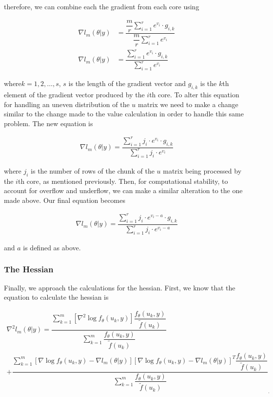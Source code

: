 \documentclass{article}
\begin{document}
\noindent therefore, we can combine each the gradient from each core using

\begin{align}
\nabla l_m(\theta|y) &=\dfrac{\dfrac{m}{r} \sum\limits_{i=1}^r e^{v_i} \cdot g_{i,k}}{\dfrac{m}{r} \sum\limits_{i=1}^r e^{v_i}} \\
\nabla l_m(\theta|y) &=\dfrac{ \sum\limits_{i=1}^r e^{v_i} \cdot g_{i,k}}{\sum\limits_{i=1}^r e^{v_i}}
\end{align}

\noindent where$k = 1, 2, \ldots, s$,  $s$ is the length of the gradient vector and $g_{i,k}$ is the $k$th element of the gradient vector produced by the $i$th core. To alter this equation for handling an uneven distribution of the $u$ matrix we need to make a change similar to the change made to the value calculation in order to handle this same problem. The new equation is

\begin{align}
\nabla l_m(\theta|y) =\dfrac{ \sum\limits_{i=1}^r j_i \cdot e^{v_i} \cdot g_{i,k}}{\sum\limits_{i=1}^r j_i \cdot e^{v_i}}
\end{align}

\noindent where $j_i$ is the number of rows of the chunk of the $u$ matrix being processed by the $i$th core, as mentioned previously. Then, for computational stability, to account for overflow and underflow, we can make a similar alteration to the one made above. Our final equation becomes

\begin{align}
\nabla l_m(\theta|y) =\dfrac{ \sum\limits_{i=1}^r j_i \cdot e^{v_i - a} \cdot g_{i,k}}{\sum\limits_{i=1}^r j_i \cdot e^{v_i - a}}
\end{align}

\noindent and $a$ is defined as above. 

\subsubsection{The Hessian}
Finally, we approach the calculations for the hessian. First, we know that the equation to calculate the hessian is 

\begin{multline}
\nabla^2 l_m(\theta|y)= \dfrac{   \sum_{k=1}^m \left[ \nabla^2 \log f_\theta(u_k,y)     \right]  \dfrac{ f_\theta(u_k,y)}{\tilde{f}(u_k)}  }{\sum_{k=1}^m  \dfrac{ f_\theta(u_k,y)   }{\tilde{f}(u_k)}}\\
+ \dfrac{   \sum_{k=1}^m \left[ \nabla \log f_\theta(u_k,y)  - \nabla l_m(\theta|y)   \right] \left[ \nabla \log f_\theta(u_k,y)  -\nabla l_m(\theta|y)  \right]^T  \dfrac{ f_\theta(u_k,y)   }{\tilde{f}(u_k)}   }{\sum_{k=1}^m  \dfrac{ f_\theta(u_k,y)   }{\tilde{f}(u_k)}}_.
\end{multline}
\end{document}
